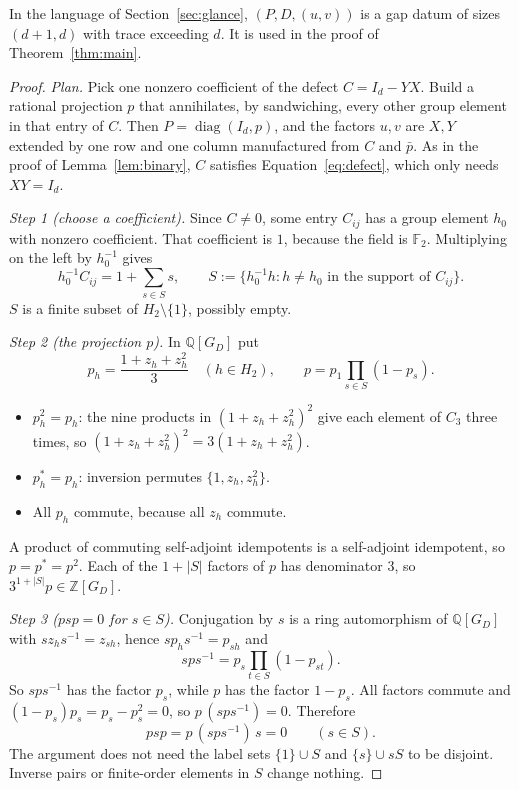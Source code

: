 \documentclass[11pt]{article}
\theoremstyle{remark}
\numberwithin{equation}{section}
\newcommand{\F}{\mathbb F}
\newcommand{\Z}{\mathbb Z}
\newcommand{\Q}{\mathbb Q}
\newcommand{\diag}{\operatorname{diag}}
\begin{document}
In the language of Section~\ref{sec:glance}, $(P,D,(u,v))$ is a gap datum of sizes $(d+1,d)$ with trace exceeding $d$. It is used in the proof of Theorem~\ref{thm:main}.

\begin{proof}
\emph{Plan.} Pick one nonzero coefficient of the defect $C=I_d-YX$. Build a rational projection $p$ that annihilates, by sandwiching, every other group element in that entry of $C$. Then $P=\diag(I_d,p)$, and the factors $u,v$ are $X,Y$ extended by one row and one column manufactured from $C$ and $\bar p$. As in the proof of Lemma~\ref{lem:binary}, $C$ satisfies Equation~\eqref{eq:defect}, which only needs $XY=I_d$.

\emph{Step 1 (choose a coefficient).} Since $C\ne0$, some entry $C_{ij}$ has a group element $h_0$ with nonzero coefficient. That coefficient is $1$, because the field is $\F_2$. Multiplying on the left by $h_0^{-1}$ gives
\begin{equation}\label{eq:support}
 h_0^{-1}C_{ij}=1+\sum_{s\in S}s,
 \qquad S:=\{h_0^{-1}h: h\ne h_0\text{ in the support of }C_{ij}\}.
\end{equation}
$S$ is a finite subset of $H_2\setminus\{1\}$, possibly empty.

\emph{Step 2 (the projection $p$).} In $\Q[G_D]$ put
\[
 p_h=\frac{1+z_h+z_h^2}{3}\quad(h\in H_2),\qquad
 p=p_1\prod_{s\in S}(1-p_s).
\]
\begin{itemize}[leftmargin=2em]
\item $p_h^2=p_h$: the nine products in $(1+z_h+z_h^2)^2$ give each element of $C_3$ three times, so $(1+z_h+z_h^2)^2=3(1+z_h+z_h^2)$.
\item $p_h^*=p_h$: inversion permutes $\{1,z_h,z_h^2\}$.
\item All $p_h$ commute, because all $z_h$ commute.
\end{itemize}
A product of commuting self-adjoint idempotents is a self-adjoint idempotent, so $p=p^*=p^2$. Each of the $1+|S|$ factors of $p$ has denominator $3$, so $3^{1+|S|}p\in\Z[G_D]$.

\emph{Step 3 ($psp=0$ for $s\in S$).} Conjugation by $s$ is a ring automorphism of $\Q[G_D]$ with $sz_hs^{-1}=z_{sh}$, hence $sp_hs^{-1}=p_{sh}$ and
\[
 sps^{-1}=p_{s}\prod_{t\in S}(1-p_{st}).
\]
So $sps^{-1}$ has the factor $p_s$, while $p$ has the factor $1-p_s$. All factors commute and $(1-p_s)p_s=p_s-p_s^2=0$, so $p\,(sps^{-1})=0$. Therefore
\begin{equation}\label{eq:separation}
 psp=p\,(sps^{-1})\,s=0\qquad(s\in S).
\end{equation}
The argument does not need the label sets $\{1\}\cup S$ and $\{s\}\cup sS$ to be disjoint. Inverse pairs or finite-order elements in $S$ change nothing.


\end{proof}
\end{document}
